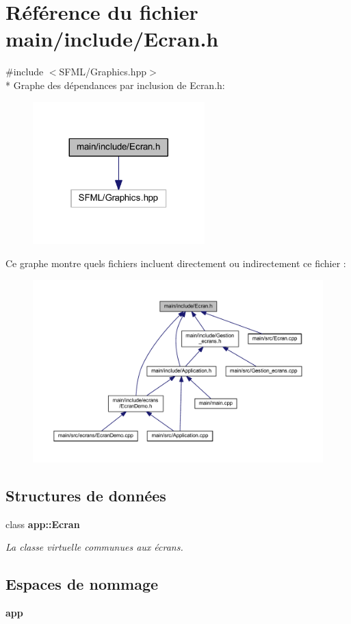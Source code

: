 \section{Référence du fichier main/include/\+Ecran.h}
\label{_ecran_8h}
{\ttfamily \#include $<$S\+F\+M\+L/\+Graphics.\+hpp$>$}\\*
Graphe des dépendances par inclusion de Ecran.\+h\+:\nopagebreak
\begin{figure}[H]
\begin{center}
\leavevmode
\includegraphics[width=188pt]{_ecran_8h__incl}
\end{center}
\end{figure}
Ce graphe montre quels fichiers incluent directement ou indirectement ce fichier \+:\nopagebreak
\begin{figure}[H]
\begin{center}
\leavevmode
\includegraphics[width=350pt]{_ecran_8h__dep__incl}
\end{center}
\end{figure}
\subsection*{Structures de données}
\begin{DoxyCompactItemize}
\item 
class {\bf app\+::\+Ecran}
\begin{DoxyCompactList}\small\item\em La classe virtuelle communues aux écrans. \end{DoxyCompactList}\end{DoxyCompactItemize}
\subsection*{Espaces de nommage}
\begin{DoxyCompactItemize}
\item 
 {\bf app}
\end{DoxyCompactItemize}
